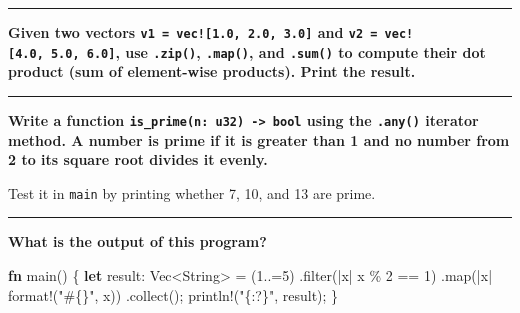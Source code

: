\documentclass[
  11pt,
]{article}
\newenvironment{Shaded}{}{}
\newcommand{\DataTypeTok}[1]{\textcolor[rgb]{0.56,0.13,0.00}{#1}}
\newcommand{\DecValTok}[1]{\textcolor[rgb]{0.25,0.63,0.44}{#1}}
\newcommand{\KeywordTok}[1]{\textcolor[rgb]{0.00,0.44,0.13}{\textbf{#1}}}
\newcommand{\NormalTok}[1]{#1}
\newcommand{\OperatorTok}[1]{\textcolor[rgb]{0.40,0.40,0.40}{#1}}
\newcommand{\PreprocessorTok}[1]{\textcolor[rgb]{0.74,0.48,0.00}{#1}}
\newcommand{\StringTok}[1]{\textcolor[rgb]{0.25,0.44,0.63}{#1}}
\begin{document}
\begin{center}\rule{0.5\linewidth}{0.5pt}\end{center}

\textbf{Given two vectors \texttt{v1\ =\ vec!{[}1.0,\ 2.0,\ 3.0{]}} and
\texttt{v2\ =\ vec!{[}4.0,\ 5.0,\ 6.0{]}}, use \texttt{.zip()},
\texttt{.map()}, and \texttt{.sum()} to compute their dot product (sum
of element-wise products). Print the result.}

\begin{Shaded}
\begin{Highlighting}[]

\end{Highlighting}
\end{Shaded}

\begin{center}\rule{0.5\linewidth}{0.5pt}\end{center}

\textbf{Write a function
\texttt{is\_prime(n:\ u32)\ -\textgreater{}\ bool} using the
\texttt{.any()} iterator method. A number is prime if it is greater than
1 and no number from 2 to its square root divides it evenly.}

Test it in \texttt{main} by printing whether 7, 10, and 13 are prime.

\begin{Shaded}
\begin{Highlighting}[]

\end{Highlighting}
\end{Shaded}

\begin{center}\rule{0.5\linewidth}{0.5pt}\end{center}

\textbf{What is the output of this program?}

\begin{Shaded}
\begin{Highlighting}[]
\KeywordTok{fn}\NormalTok{ main() }\OperatorTok{\{}
    \KeywordTok{let}\NormalTok{ result}\OperatorTok{:} \DataTypeTok{Vec}\OperatorTok{\textless{}}\DataTypeTok{String}\OperatorTok{\textgreater{}} \OperatorTok{=}\NormalTok{ (}\DecValTok{1}\OperatorTok{..=}\DecValTok{5}\NormalTok{)}
        \OperatorTok{.}\NormalTok{filter(}\OperatorTok{|}\NormalTok{x}\OperatorTok{|}\NormalTok{ x }\OperatorTok{\%} \DecValTok{2} \OperatorTok{==} \DecValTok{1}\NormalTok{)}
        \OperatorTok{.}\NormalTok{map(}\OperatorTok{|}\NormalTok{x}\OperatorTok{|} \PreprocessorTok{format!}\NormalTok{(}\StringTok{"\#\{\}"}\OperatorTok{,}\NormalTok{ x))}
        \OperatorTok{.}\NormalTok{collect()}\OperatorTok{;}
    \PreprocessorTok{println!}\NormalTok{(}\StringTok{"\{:?\}"}\OperatorTok{,}\NormalTok{ result)}\OperatorTok{;}
\OperatorTok{\}}
\end{Highlighting}
\end{Shaded}
\end{document}
